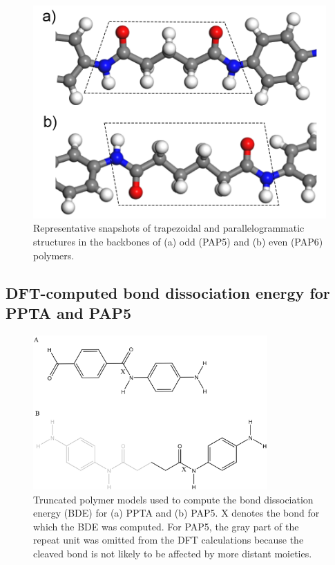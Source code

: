 \documentclass[journal=langd5,manuscript=article]{achemso}
\begin{document}
\begin{figure}[h!]
\centering
\includegraphics[scale=0.35]{Figure S3 Parallelogram and Trapezoid.png}
\caption{Representative snapshots of trapezoidal and parallelogrammatic structures in the backbones of (a) odd (PAP5) and (b) even (PAP6) polymers. 
}
\label{fig:ParallelogramANDTrapezoid}
\end{figure}

\FloatBarrier
\subsection{DFT-computed bond dissociation energy for PPTA and PAP5}

\begin{figure}[h!]
\centering
\includegraphics[width=0.8\textwidth]{DFT_figure_chemdraw.png}
\caption{Truncated polymer models used to compute the bond dissociation
energy (BDE) for (a) PPTA and (b) PAP5.
X denotes the bond for which the BDE was computed.
For PAP5, the gray part of the repeat unit was omitted from the DFT calculations
because the cleaved bond is not likely to be affected by more distant
moieties.
}
\label{fig:DFT}
\end{figure}
\end{document}
